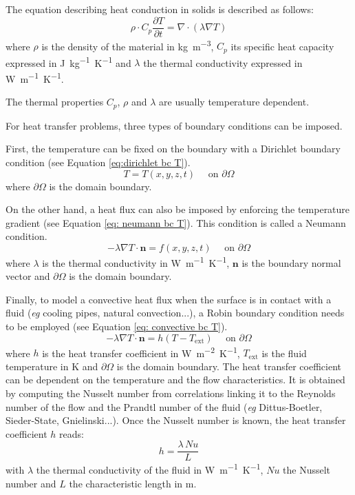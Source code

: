 The equation describing heat conduction in solids is described as follows:
\begin{equation}
    \rho \cdot C_p \frac{\partial T}{\partial t}=\nabla \cdot (\lambda \nabla T)
    \label{eq:heat equation}
\end{equation}
where $\rho$ is the density of the material in \si{kg.m^{-3}}, $C_p$ its specific heat capacity expressed in \si{J.kg^{-1}.K^{-1}} and $\lambda$ the thermal conductivity expressed in \si{W.m^{-1}.K^{-1}}.

The thermal properties $C_p$, $\rho$ and $\lambda$ are usually temperature dependent.

For heat transfer problems, three types of boundary conditions can be imposed.

First, the temperature can be fixed on the boundary with a Dirichlet boundary condition (see Equation \ref{eq:dirichlet bc T}).
\begin{equation}
    T = T(x, y, z, t) \quad \text { on } \partial \Omega
    \label{eq:dirichlet bc T}
\end{equation}
where $\partial \Omega$ is the domain boundary.

On the other hand, a heat flux can also be imposed by enforcing the temperature gradient (see Equation \ref{eq: neumann bc T}).
This condition is called a Neumann condition.
\begin{equation}
    -\lambda \nabla T \cdot \mathbf{n} = f(x, y, z, t) \quad \text { on } \partial \Omega
    \label{eq: neumann bc T}
\end{equation}
where $\lambda$ is the thermal conductivity in \si{W.m^{-1}.K^{-1}}, $\mathbf{n}$ is the boundary normal vector and $\partial \Omega$ is the domain boundary.

Finally, to model a convective heat flux when the surface is in contact with a fluid (\textit{eg} cooling pipes, natural convection...), a Robin boundary condition needs to be employed (see Equation \ref{eq: convective bc T}).
\begin{equation}
    -\lambda \nabla T \cdot \mathbf{n} = h (T - T_\mathrm{ext}) \quad \text { on } \partial \Omega
    \label{eq: convective bc T}
\end{equation}
where $h$ is the heat transfer coefficient in \si{W.m^{-2}.K^{-1}}, $T_\mathrm{ext}$ is the fluid temperature in \si{K} and $\partial \Omega$ is the domain boundary.
The heat transfer coefficient can be dependent on the temperature and the flow characteristics.
It is obtained by computing the Nusselt number from correlations linking it to the Reynolds number of the flow and the Prandtl number of the fluid  (\textit{eg} Dittus-Boetler, Sieder-State, Gnielinski...).
Once the Nusselt number is known, the heat transfer coefficient $h$ reads:
\begin{equation}
    h = \frac{\lambda \, \textit{Nu}}{L}
\end{equation}
with $\lambda$ the thermal conductivity of the fluid in \si{W.m^{-1}.K^{-1}}, $\textit{Nu}$ the Nusselt number and $L$ the characteristic length in \si{m}.


